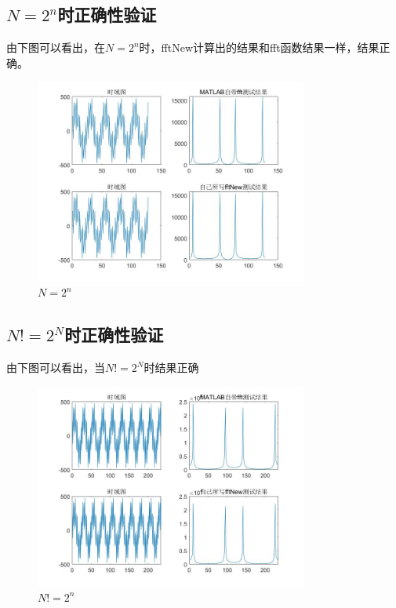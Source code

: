 \documentclass{../source/zju}
\begin{document}
    \subsection{$N=2^n$时正确性验证}
    由下图可以看出，在$N=2^n$时，fftNew计算出的结果和fft函数结果一样，结果正确。
    \begin{figure}[thp]
        \centering
        \includegraphics[width = 0.8\textwidth]{figure/正确性验证.jpg}
        \caption{$N=2^n$}
    \end{figure}

    \subsection{$N!=2^N$时正确性验证}
    由下图可以看出，当$N!=2^N$时结果正确
    \begin{figure}[thp]
        \centering
        \includegraphics[width = 0.8\textwidth]{figure/N=234.jpg}
        \caption{$N!=2^n$}
    \end{figure}
\end{document}
